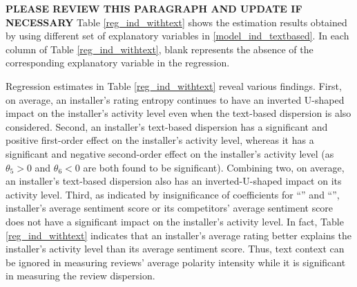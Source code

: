 \documentclass[msom,blindrev]{informs3}
\begin{document}
	
	\textbf{PLEASE REVIEW THIS PARAGRAPH AND UPDATE IF NECESSARY} Table \ref{reg_ind_withtext} shows the estimation results obtained by using different set of explanatory variables in \eqref{model_ind_textbased}. In each column of Table \ref{reg_ind_withtext}, blank represents the absence of the corresponding explanatory variable in the regression.
	
	Regression estimates in Table \ref{reg_ind_withtext} reveal various findings. First, on average, an installer's rating entropy continues to have an inverted U-shaped impact on the installer's activity level even when the text-based dispersion is also considered. Second, an installer's text-based dispersion has a significant and positive first-order effect on the installer's activity level, whereas it has a significant and negative second-order effect  on the installer's activity level (as $\theta_{5} > 0$ and $\theta_{6} < 0$ are both found to be significant). Combining two, on average, an installer's text-based dispersion also has an inverted-U-shaped impact on its activity level.
	Third, as indicated by insignificance of coefficients for ``'' and ``'', installer's average sentiment score or its competitors' average sentiment score does not have a significant impact on the installer's activity level. In fact,  Table \ref{reg_ind_withtext} indicates that an installer's average rating better explains the installer's activity level than its average sentiment score. Thus, text context can be ignored in measuring reviews' average polarity intensity  while it is significant in measuring the review dispersion.
	
	
\end{document}
